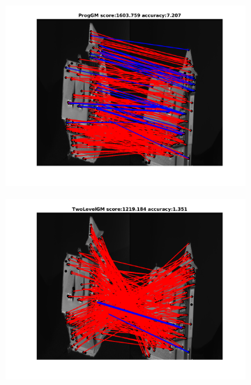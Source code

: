 \documentclass[
	fontsize=12pt,
	paper=a4,
	twoside=false,
	numbers=noenddot,
	plainheadsepline,
	toc=listof,
	toc=bibliography
]{scrartcl}
\begin{document}
\begin{figure}[h!] 
	\begin{subfigure}[b]{0.3\textwidth}
		\centering
		\includegraphics[scale=0.25]{"fig_ver2608/RealImages/House_seq/no_descr/using_cdf_afftrafo/solution/fi_11_ProgGM"}  
	\end{subfigure}%
	\begin{subfigure}[b]{0.3\textwidth}
		\centering
		\includegraphics[scale=0.25]{"fig_ver2608/RealImages/House_seq/no_descr/using_cdf_afftrafo/solution/fi_11_TwoLevelGM"}  
	\end{subfigure} 
	\begin{subfigure}[b]{0.3\textwidth}
		\centering

\end{subfigure}
\end{figure}
\end{document}
